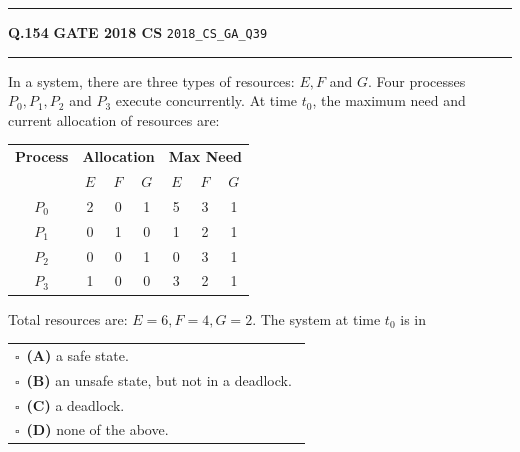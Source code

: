 \documentclass[a4paper,10pt]{article}
\begin{document}
\vspace{6pt}\hrule height 0.35pt\vspace{6pt}
\noindent
\begin{tcolorbox}[
    blanker,
    sidebyside,
    sidebyside align=top,
    lefthand width=0.55\textwidth,
    top=4pt, bottom=4pt, left=0pt, right=0pt,
    middle=16pt,
    underlay={
        \draw[dashed, black!80, line width=0.8pt, dash pattern=on 4pt off 3pt]
            ([xshift=0.55\textwidth+8pt]frame.north west) --
            ([xshift=0.55\textwidth+8pt]frame.south west);
    }
]
\textbf{Q.154}  \hfill {\footnotesize\textbf{GATE 2018 CS} \quad \tiny\texttt{2018\_CS\_GA\_Q39}}
\vspace{2pt}\hrule height 0.3pt\vspace{4pt}

In a system, there are three types of resources: $E, F$ and $G$. Four processes $P_0, P_1, P_2$ and $P_3$ execute concurrently. At time $t_0$, the maximum need and current allocation of resources are:
\begin{center}
\begin{tabular}{c|ccc|ccc}
\textbf{Process} & \multicolumn{3}{c|}{\textbf{Allocation}} & \multicolumn{3}{c}{\textbf{Max Need}} \\
& $E$ & $F$ & $G$ & $E$ & $F$ & $G$ \\
\hline
$P_0$ & 2 & 0 & 1 & 5 & 3 & 1 \\
$P_1$ & 0 & 1 & 0 & 1 & 2 & 1 \\
$P_2$ & 0 & 0 & 1 & 0 & 3 & 1 \\
$P_3$ & 1 & 0 & 0 & 3 & 2 & 1 \\
\end{tabular}
\end{center}
Total resources are: $E = 6, F = 4, G = 2$. The system at time $t_0$ is in

\par\vspace{6pt}\noindent
\begin{tabular}{@{}p{0.98\linewidth}@{}}
$\square$\ \textbf{(A)} a safe state. \\
\addlinespace[3pt]
$\square$\ \textbf{(B)} an unsafe state, but not in a deadlock. \\
\addlinespace[3pt]
$\square$\ \textbf{(C)} a deadlock. \\
\addlinespace[3pt]
$\square$\ \textbf{(D)} none of the above.
\end{tabular}


\end{tcolorbox}
\end{document}
